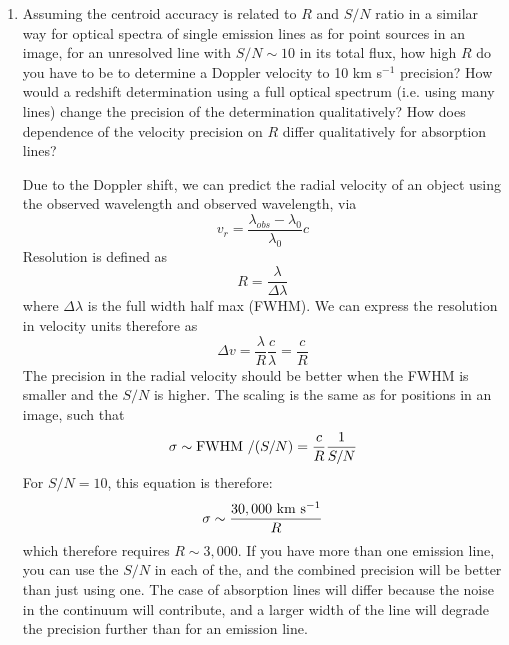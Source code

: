 \begin{enumerate} 
\item Assuming the centroid accuracy is related to $R$ and $S/N$ ratio
    in a similar way for optical spectra of single emission lines as
    for point sources in an image, for an unresolved line with
    $S/N \sim 10$ in its total flux, how high $R$ do you have to be to
    determine a Doppler velocity to 10 km s$^{-1}$ precision?  How
    would a redshift determination using a full optical spectrum
    (i.e. using many lines) change the precision of the determination
    qualitatively? How does dependence of the velocity precision on
    $R$ differ qualitatively for absorption lines?

\begin{answer}
    Due to the Doppler shift, we can predict the radial velocity of an
    object using the observed wavelength and observed wavelength,
    via
\begin{equation}
    v_r = \frac{\lambda_{obs} -\lambda_0}{\lambda_0} c
\end{equation}
    Resolution is defined as
    \begin{equation}
        R = \frac{\lambda}{\Delta \lambda}
    \end{equation}
    where $\Delta \lambda$ is the full width half max (FWHM). We
    can express the resolution in velocity units therefore as
    \begin{equation}
    \Delta v = \frac{\lambda}{R } \frac{c}{\lambda} = \frac{c}{R}
\end{equation}
    The precision in the radial velocity should be better when the FWHM is
    smaller and the $S/N$ is higher. The scaling is the same as for
    positions in an image, such that
    \begin{equation}
    \sigma \sim {\rm FWHM~}/ (S/N) = \frac{c}{R} \frac{1}{S/N}
    \end{equation}
    For $S/N = 10$, this equation is therefore:
    \begin{equation}
    \sigma \sim \frac{30,000 {\rm ~km} {\rm ~s}^{-1}}{R}
    \end{equation}
    which therefore requires $R\sim 3,000$.  If you have more than one
    emission line, you can use the $S/N$ in each of the, and the
    combined precision will be better than just using one. The case of
    absorption lines will differ because the noise in the continuum
    will contribute, and a larger width of the line will degrade the
    precision further than for an emission line.
\end{answer}
\end{enumerate} 


